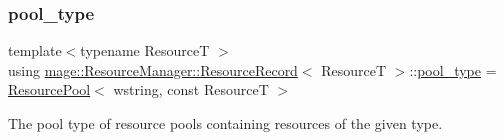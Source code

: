 \subsubsection{\texorpdfstring{pool\+\_\+type}{pool\_type}}
{\footnotesize\ttfamily template$<$typename ResourceT $>$ \\
using \hyperlink{structmage_1_1_resource_manager_1_1_resource_record}{mage\+::\+Resource\+Manager\+::\+Resource\+Record}$<$ ResourceT $>$\+::\hyperlink{structmage_1_1_resource_manager_1_1_resource_record_a195d1199a060292958718d215dbce748}{pool\+\_\+type} =  \hyperlink{classmage_1_1_resource_pool}{Resource\+Pool}$<$ wstring, const ResourceT $>$}

The pool type of resource pools containing resources of the given type. 